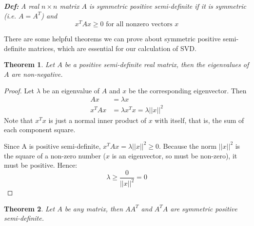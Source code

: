\documentclass{article}
\newtheorem{theorem}{Theorem}
\begin{document}
\textit{\textbf{Def:}} \textit{A real $n \times n$ matrix $A$ is symmetric positive semi-definite if it is symmetric (i.e. $A=A^T$) and 
$$ x^T A x \geq 0 \text{ for all nonzero vectors }x$$}
\bigskip

There are some helpful theorems we can prove about symmetric positive semi-definite matrices, which are essential for our calculation of SVD.
\bigskip

\begin{theorem}
Let $A$ be a positive semi-definite real matrix, then the eigenvalues of $A$ are non-negative.
\end{theorem} 

\begin{proof}
Let $\lambda$ be an eigenvalue of $A$ and $x$ be the corresponding eigenvector. Then 
\begin{align*}
Ax &=\lambda x \\
x^T A x &= \lambda x^Tx  = \lambda || x ||^2 
\end{align*}
Note that $x^T x$ is just a normal inner product of $x$ with itself, that is, the sum of each component square.
  
Since A is positive semi-definite, $x^T A x =\lambda ||x||^2 \geq 0$. Because the norm $||x||^2 $ is the square of a non-zero number ($x$ is an eigenvector, so must be non-zero), it must be positive. Hence: $$\lambda \geq \frac{0}{||x||^2} = 0$$
\end{proof}
\bigskip

\begin{theorem}
Let $A$ be any matrix, then $AA^T$ and $A^TA$ are symmetric positive semi-definite.
\end{theorem}
\end{document}

